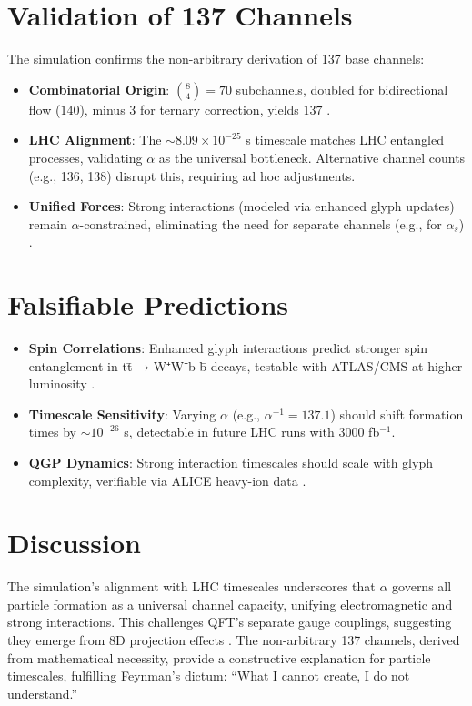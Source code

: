 \documentclass[12pt]{article}
\theoremstyle{definition}
\begin{document}
\section{Validation of 137 Channels}
The simulation confirms the non-arbitrary derivation of 137 base channels:
\begin{itemize}
    \item \textbf{Combinatorial Origin}: $\binom{8}{4} = 70$ subchannels, doubled for bidirectional flow ($140$), minus 3 for ternary correction, yields $137$ \citep{macedonia2025supplementA}.
    \item \textbf{LHC Alignment}: The $\sim 8.09 \times 10^{-25}$ s timescale matches LHC entangled processes, validating $\alpha$ as the universal bottleneck. Alternative channel counts (e.g., 136, 138) disrupt this, requiring ad hoc adjustments.
    \item \textbf{Unified Forces}: Strong interactions (modeled via enhanced glyph updates) remain $\alpha$-constrained, eliminating the need for separate channels (e.g., for $\alpha_s$) \citep{pdg2024}.
\end{itemize}

\section{Falsifiable Predictions}
\begin{itemize}
    \item \textbf{Spin Correlations}: Enhanced glyph interactions predict stronger spin entanglement in tt̄ → W⁺W⁻b b̄ decays, testable with ATLAS/CMS at higher luminosity \citep{atlas2022ttbar}.
    \item \textbf{Timescale Sensitivity}: Varying $\alpha$ (e.g., $\alpha^{-1} = 137.1$) should shift formation times by $\sim 10^{-26}$ s, detectable in future LHC runs with $3000$ fb$^{-1}$.
    \item \textbf{QGP Dynamics}: Strong interaction timescales should scale with glyph complexity, verifiable via ALICE heavy-ion data \citep{alice2017femtoscopy}.
\end{itemize}

\section{Discussion}
The simulation’s alignment with LHC timescales underscores that $\alpha$ governs all particle formation as a universal channel capacity, unifying electromagnetic and strong interactions. This challenges QFT’s separate gauge couplings, suggesting they emerge from 8D projection effects \citep{macedonia2025primer}. The non-arbitrary 137 channels, derived from mathematical necessity, provide a constructive explanation for particle timescales, fulfilling Feynman’s dictum: ``What I cannot create, I do not understand.''
\end{document}
